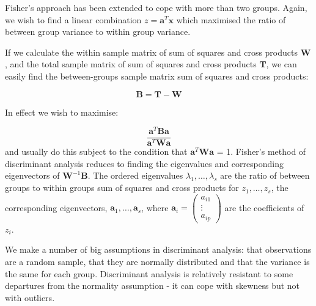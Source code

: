 Fisher's approach has been extended to cope with more than two groups.  Again, we wish to find a linear combination $z = \boldsymbol{a}^{T} \boldsymbol{x}$ which maximised the ratio of between group variance to within group variance.

If we calculate the within sample matrix of sum of squares and cross products $\boldsymbol{W}$, and the total sample matrix of sum of squares and cross products $\boldsymbol{T}$, we can easily find the between-groups sample matrix sum of squares and cross products:

\begin{equation}
\boldsymbol{B} = \boldsymbol{T} - \boldsymbol{W}
\end{equation}



In effect we wish to maximise:

\begin{equation}
\frac{ \boldsymbol{a}^{T} \boldsymbol{B} \boldsymbol{a}}{ \boldsymbol{a}^{T} \boldsymbol{W} \boldsymbol{a}} 
\end{equation}
and usually do this subject to the condition that $\boldsymbol{a}^{T} \boldsymbol{W} \boldsymbol{a}$ = 1.   Fisher's method of discriminant analysis reduces to finding the eigenvalues and corresponding eigenvectors of $\boldsymbol{W}^{-1}\boldsymbol{B}$.   The ordered eigenvalues $\lambda_{1}, \ldots, \lambda_{s}$ are the ratio of between groups to within groups sum of squares and cross products for $z_{1}, \ldots, z_{s}$, the corresponding eigenvectors, $\boldsymbol{a}_{1}, \ldots, \boldsymbol{a}_{s}$, where $\boldsymbol{a}_{i} = \left( \begin{array}{c} a_{i1} \\ \vdots \\ a_{ip} \end{array} \right)$ are the coefficients of $z_{i}$.

We make a number of big assumptions in discriminant analysis: that observations are a random sample, that they are normally distributed and that the variance is the same for each group.   Discriminant analysis is relatively resistant to some departures from the normality assumption - it can cope with skewness but not with outliers.   %





